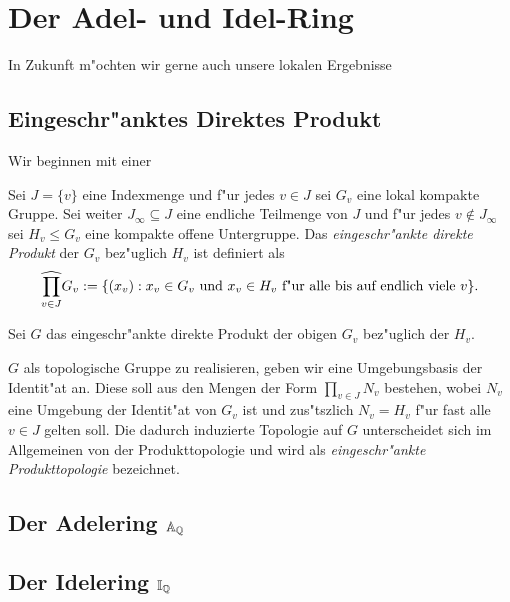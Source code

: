 \section{Der Adel- und Idel-Ring}
	In Zukunft m"ochten wir gerne auch unsere lokalen Ergebnisse 
	\subsection{Eingeschr"anktes Direktes Produkt}
		Wir beginnen mit einer
		\begin{defi}
			Sei $J=\{v\}$ eine Indexmenge und f"ur jedes $v \in J$ sei $G_v$ eine lokal kompakte Gruppe. 
			Sei weiter $J_\infty \subseteq J$ eine endliche Teilmenge von $J$ und f"ur jedes $v \notin J_\infty$ sei $H_v\leq G_v$ eine kompakte offene Untergruppe. 
			Das \textit{eingeschr"ankte direkte Produkt} der $G_v$ bez"uglich $H_v$ ist definiert als 
			\begin{align*}
				\widehat{\prod\limits_{v \in J}} G_v := \{ (x_v): x_v \in G_v \text{ und } x_v \in H_v \text{ f"ur alle bis auf endlich viele } v \}.
			\end{align*}
		\end{defi}
		Sei $G$ das eingeschr"ankte direkte Produkt der obigen $G_v$ bez"uglich der $H_v$. 
		
		$G$ als topologische Gruppe zu realisieren, geben wir eine Umgebungsbasis der Identit"at an. Diese soll aus den Mengen der Form $\prod_{v \in J}{N_v}$ bestehen, wobei $N_v$ eine Umgebung der Identit"at von $G_v$ ist und zus"tszlich $N_v = H_v$ f"ur fast alle $v\in J$ gelten soll. Die dadurch induzierte Topologie auf $G$ unterscheidet sich im Allgemeinen von der Produkttopologie und wird als \textit{eingeschr"ankte Produkttopologie} bezeichnet.
		
		
	\subsection{Der Adelering $\mathbb{A}_{\mathbb{Q}}$}
	\subsection{Der Idelering $\mathbb{I}_{\mathbb{Q}}$}
	